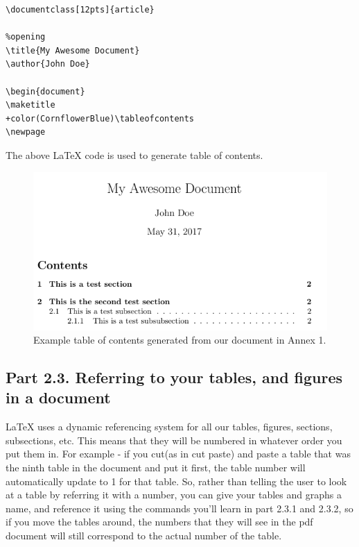 \documentclass[12pts]{report}
\begin{document}
\begin{multicols}{2}
	
\begin{Verbatim}[commandchars=+\(\)]
\documentclass[12pts]{article}

%opening
\title{My Awesome Document}
\author{John Doe}

\begin{document}
\maketitle
+color(CornflowerBlue)\tableofcontents
\newpage

\end{Verbatim}
The above {\LaTeX} code is used to generate table of contents.

\columnbreak
\begin{figure} [H]
	\centering
	\includegraphics[width=1\linewidth]{../img/tableofcontents2}
	\caption{Example table of contents generated from our document in Annex 1.}
	\label{fig:tableofcontents}
\end{figure}
\end{multicols}

\subsection*{Part 2.3. Referring to your tables, and figures in a document}

{\LaTeX} uses a dynamic referencing system for all our tables, figures, sections, subsections, etc. This means that they will be numbered in whatever order you put them in. For example - if you cut(as in cut paste) and paste a table that was the ninth table in the document and put it first, the table number will automatically update to 1 for that table. So, rather than telling the user to look at a table by referring it with a number, you can give your tables and graphs a name, and reference it using the commands you'll learn in part 2.3.1 and 2.3.2, so if you move the tables around, the numbers that they will see in the pdf document will still correspond to the actual number of the table. 
\end{document}
